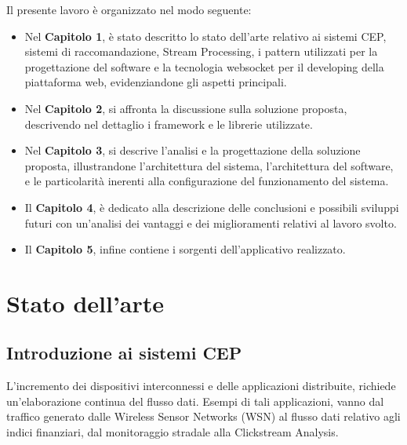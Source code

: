\documentclass[12pt]{article}
\begin{document}
Il presente lavoro è organizzato nel modo seguente:
\begin{itemize}
\item Nel \textbf{Capitolo 1}, è stato descritto lo stato dell'arte relativo ai sistemi CEP, sistemi di raccomandazione, Stream Processing, i pattern utilizzati per la progettazione del software e la tecnologia websocket per il developing della piattaforma web, evidenziandone gli aspetti principali.
\item Nel \textbf{Capitolo 2}, si affronta la discussione sulla soluzione proposta, descrivendo nel dettaglio i framework e le librerie utilizzate.
\item Nel \textbf{Capitolo 3}, si descrive l'analisi e la progettazione della soluzione proposta, illustrandone l'architettura del sistema, l'architettura del software, e le particolarità inerenti alla configurazione del funzionamento del sistema.
\item Il \textbf{Capitolo 4}, è dedicato alla descrizione delle conclusioni e possibili sviluppi futuri con un'analisi dei vantaggi e dei miglioramenti relativi al lavoro svolto.
\item Il \textbf{Capitolo 5}, infine contiene i sorgenti dell'applicativo realizzato.
\end{itemize}
\newpage
\section{Stato dell'arte}

\subsection{Introduzione ai sistemi CEP}
L'incremento dei dispositivi interconnessi e delle applicazioni distribuite, richiede un'elaborazione continua del flusso dati. Esempi di tali applicazioni, vanno dal traffico generato dalle Wireless Sensor Networks (WSN) al flusso dati relativo agli indici finanziari, dal monitoraggio stradale alla Clickstream Analysis. 
\end{document}
